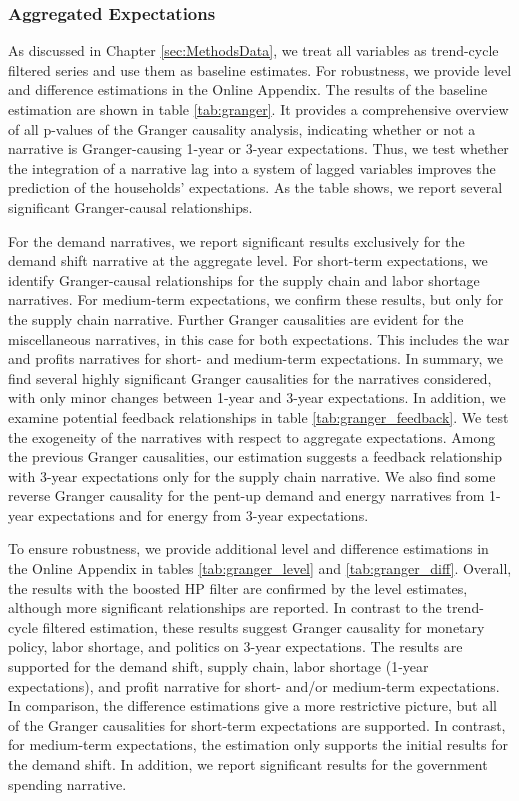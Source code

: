 \subsubsection{Aggregated Expectations}

As discussed in Chapter \ref{sec:MethodsData}, we treat all variables as trend-cycle filtered series and use them as baseline estimates. For robustness, we provide level and difference estimations in the Online Appendix. The results of the baseline estimation are shown in table \ref{tab:granger}. It provides a comprehensive overview of all p-values of the Granger causality analysis, indicating whether or not a narrative is Granger-causing 1-year or 3-year expectations. Thus, we test whether the integration of a narrative lag into a system of lagged variables improves the prediction of the households' expectations. As the table shows, we report several significant Granger-causal relationships.

For the demand narratives, we report significant results exclusively for the demand shift narrative at the aggregate level. For short-term expectations, we identify Granger-causal relationships for the supply chain and labor shortage narratives. For medium-term expectations, we confirm these results, but only for the supply chain narrative. Further Granger causalities are evident for the miscellaneous narratives, in this case for both expectations. This includes the war and profits narratives for short- and medium-term expectations. In summary, we find several highly significant Granger causalities for the narratives considered, with only minor changes between 1-year and 3-year expectations. In addition, we examine potential feedback relationships in table \ref{tab:granger_feedback}. We test the exogeneity of the narratives with respect to aggregate expectations. Among the previous Granger causalities, our estimation suggests a feedback relationship with 3-year expectations only for the supply chain narrative. We also find some reverse Granger causality for the pent-up demand and energy narratives from 1-year expectations and for energy from 3-year expectations. 



To ensure robustness, we provide additional level and difference estimations in the Online Appendix in tables \ref{tab:granger_level} and \ref{tab:granger_diff}. Overall, the results with the boosted HP filter are confirmed by the level estimates, although more significant relationships are reported. In contrast to the trend-cycle filtered estimation, these results suggest Granger causality for monetary policy, labor shortage, and politics on 3-year expectations. The results are supported for the demand shift, supply chain, labor shortage (1-year expectations), and profit narrative for short- and/or medium-term expectations. In comparison, the difference estimations give a more restrictive picture, but all of the Granger causalities for short-term expectations are supported. In contrast, for medium-term expectations, the estimation only supports the initial results for the demand shift. In addition, we report significant results for the government spending narrative. 

